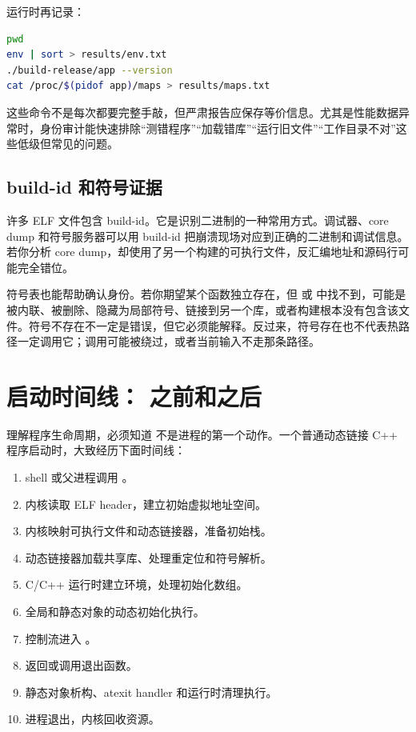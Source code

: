 运行时再记录：

\begin{lstlisting}[language=bash]
pwd
env | sort > results/env.txt
./build-release/app --version
cat /proc/$(pidof app)/maps > results/maps.txt
\end{lstlisting}

这些命令不是每次都要完整手敲，但严肃报告应保存等价信息。尤其是性能数据异常时，身份审计能快速排除“测错程序”“加载错库”“运行旧文件”“工作目录不对”这些低级但常见的问题。

\subsection{build-id 和符号证据}

许多 ELF 文件包含 build-id。它是识别二进制的一种常用方式。调试器、core dump 和符号服务器可以用 build-id 把崩溃现场对应到正确的二进制和调试信息。若你分析 core dump，却使用了另一个构建的可执行文件，反汇编地址和源码行可能完全错位。

符号表也能帮助确认身份。若你期望某个函数独立存在，但  或  中找不到，可能是被内联、被删除、隐藏为局部符号、链接到另一个库，或者构建根本没有包含该文件。符号不存在不一定是错误，但它必须能解释。反过来，符号存在也不代表热路径一定调用它；调用可能被绕过，或者当前输入不走那条路径。

\section{启动时间线： 之前和之后}

理解程序生命周期，必须知道  不是进程的第一个动作。一个普通动态链接 C++ 程序启动时，大致经历下面时间线：

\begin{enumerate}
  \item shell 或父进程调用 。
  \item 内核读取 ELF header，建立初始虚拟地址空间。
  \item 内核映射可执行文件和动态链接器，准备初始栈。
  \item 动态链接器加载共享库、处理重定位和符号解析。
  \item C/C++ 运行时建立环境，处理初始化数组。
  \item 全局和静态对象的动态初始化执行。
  \item 控制流进入 。
  \item {} 返回或调用退出函数。
  \item 静态对象析构、atexit handler 和运行时清理执行。
  \item 进程退出，内核回收资源。
\end{enumerate}

